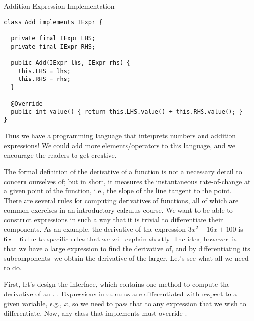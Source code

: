 \begin{cl}[]{Addition Expression Implementation}
\begin{lstlisting}[language=MyJava]
class Add implements IExpr {

  private final IExpr LHS;
  private final IExpr RHS;

  public Add(IExpr lhs, IExpr rhs) {
    this.LHS = lhs;
    this.RHS = rhs;
  }

  @Override
  public int value() { return this.LHS.value() + this.RHS.value(); }
}
\end{lstlisting}
\end{cl}

Thus we have a programming language that interprets numbers and addition expressions! We could add more elements/operators to this language, and we encourage the readers to get creative.


The formal definition of the derivative of a function is not a necessary detail to concern ourselves of; but in short, it measures the instantaneous rate-of-change at a given point of the function, i.e., the slope of the line tangent to the point. There are several rules for computing derivatives of functions, all of which are common exercises in an introductory calculus course. We want to be able to construct expressions in such a way that it is trivial to differentiate their components. As an example, the derivative of the expression $3x^2 - 16x + 100$ is $6x - 6$ due to specific rules that we will explain shortly. The idea, however, is that we have a large expression to find the derivative of, and by differentiating its subcomponents, we obtain the derivative of the larger. Let's see what all we need to do.

First, let's design the  interface, which contains one method to compute the derivative of an : . Expressions in calculus are differentiated with respect to a given variable, e.g., $x$, so we need to pass that to any expression that we wish to differentiate. Now, any class that implements  must override . 


